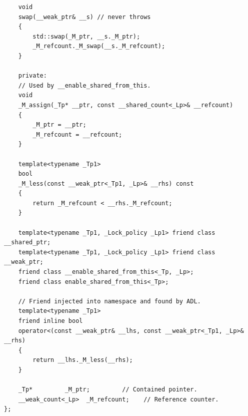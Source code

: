 \documentclass[UTF8,a4paper,12pt]{ctexbook}
\begin{document}
\begin{lstlisting}
	void
	swap(__weak_ptr& __s) // never throws
	{
		std::swap(_M_ptr, __s._M_ptr);
		_M_refcount._M_swap(__s._M_refcount);
	}
	
	private:
	// Used by __enable_shared_from_this.
	void
	_M_assign(_Tp* __ptr, const __shared_count<_Lp>& __refcount)
	{
		_M_ptr = __ptr;
		_M_refcount = __refcount;
	}
	
	template<typename _Tp1>
	bool
	_M_less(const __weak_ptr<_Tp1, _Lp>& __rhs) const
	{ 
		return _M_refcount < __rhs._M_refcount; 
	}
	
	template<typename _Tp1, _Lock_policy _Lp1> friend class __shared_ptr;
	template<typename _Tp1, _Lock_policy _Lp1> friend class __weak_ptr;
	friend class __enable_shared_from_this<_Tp, _Lp>;
	friend class enable_shared_from_this<_Tp>;
	
	// Friend injected into namespace and found by ADL.
	template<typename _Tp1>
	friend inline bool
	operator<(const __weak_ptr& __lhs, const __weak_ptr<_Tp1, _Lp>& __rhs)
	{ 
		return __lhs._M_less(__rhs); 
	}
	
	_Tp*       	 _M_ptr;         // Contained pointer.
	__weak_count<_Lp>  _M_refcount;    // Reference counter.
};
	
	\end{lstlisting}
	
\end{document}
